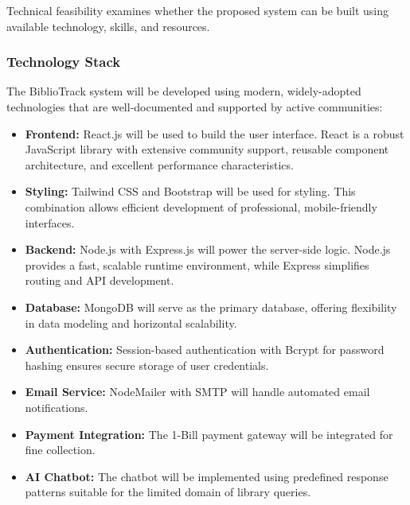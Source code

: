 \documentclass[12pt,a4paper]{report}
\begin{document}
Technical feasibility examines whether the proposed system can be built using available technology, skills, and resources.

\subsubsection{Technology Stack}

The BiblioTrack system will be developed using modern, widely-adopted technologies that are well-documented and supported by active communities:

\begin{itemize}
    \item \textbf{Frontend:} React.js will be used to build the user interface. React is a robust JavaScript library with extensive community support, reusable component architecture, and excellent performance characteristics.
    
    \item \textbf{Styling:} Tailwind CSS and Bootstrap will be used for styling. This combination allows efficient development of professional, mobile-friendly interfaces.
    
    \item \textbf{Backend:} Node.js with Express.js will power the server-side logic. Node.js provides a fast, scalable runtime environment, while Express simplifies routing and API development.
    
    \item \textbf{Database:} MongoDB will serve as the primary database, offering flexibility in data modeling and horizontal scalability.
    
    \item \textbf{Authentication:} Session-based authentication with Bcrypt for password hashing ensures secure storage of user credentials.
    
    \item \textbf{Email Service:} NodeMailer with SMTP will handle automated email notifications.
    
    \item \textbf{Payment Integration:} The 1-Bill payment gateway will be integrated for fine collection.
    
    \item \textbf{AI Chatbot:} The chatbot will be implemented using predefined response patterns suitable for the limited domain of library queries.
\end{itemize}
\end{document}
